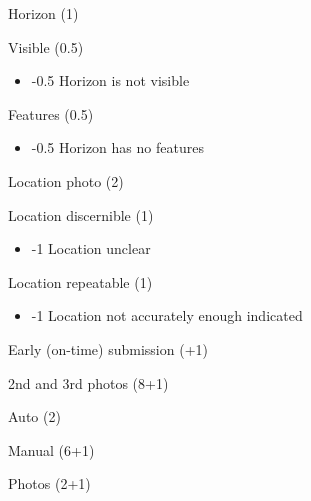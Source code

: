 \documentclass[12pt]{article}
\begin{document}
\begin{longenum}
\begin{longenum}
\begin{longenum}
\begin{longenum}
\begin{longenum}
\begin{longenum}
                    \end{longenum}
               \item Horizon (1)
                    \begin{longenum}
                    \item Visible (0.5)
                        \begin{itemize}
                        \item -0.5 Horizon is not visible
                        \end{itemize}
                    \item Features (0.5)
                        \begin{itemize}
                        \item -0.5 Horizon has no features
                        \end{itemize}
                    \end{longenum}
                \end{longenum}
            \item Location photo (2)
                \begin{longenum}
                \item Location discernible (1)
                    \begin{itemize}
                    \item -1 Location unclear
                    \end{itemize}
                \item Location repeatable (1) 
                    \begin{itemize}
                    \item -1 Location not accurately enough indicated
                    \end{itemize}
                \end{longenum}
            \end{longenum}
        \item Early (on-time) submission (+1)
        \end{longenum}
    \end{longenum}
\item 2nd and 3rd photos (8+1)
    \begin{longenum}
    \item Auto (2)
    \item Manual (6+1)
        \begin{longenum}
        \item Photos (2+1)
            \begin{longenum}

\end{longenum}
\end{longenum}
\end{longenum}
\end{longenum}
\end{document}
